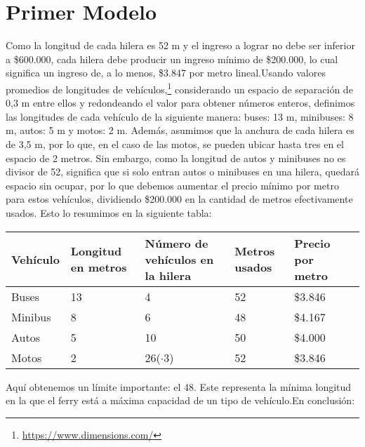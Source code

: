 \documentclass[a4paper]{article}
\begin{document}
\section{Primer Modelo}
Como la longitud de cada hilera es 52 m y el ingreso a lograr no debe ser inferior a \$600.000, cada hilera debe producir un ingreso mínimo de \$200.000, lo cual significa un ingreso de, a lo menos, \$3.847 por metro lineal.\newline\newline Usando valores promedios de longitudes de vehículos,\footnote{\url{https://www.dimensions.com/}} considerando un espacio de separación de 0,3 m entre ellos y redondeando el valor para obtener números enteros, definimos las longitudes de cada vehículo de la siguiente manera: buses: 13 m, minibuses: 8 m, autos: 5 m y motos: 2 m. Además, asumimos que la anchura de cada hilera es de 3,5 m, por lo que, en el caso de las motos, se pueden ubicar hasta tres en el espacio de 2 metros. \newline\newline Sin embargo, como la longitud de autos y minibuses no es divisor de 52, significa que si solo entran autos o minibuses en una hilera, quedará espacio sin ocupar, por lo que debemos aumentar el precio mínimo por metro para estos vehículos, dividiendo \$200.000 en la cantidad de metros efectivamente usados. Esto lo resumimos en la siguiente tabla:
\begin{table}[h]
    \centering
    \begin{adjustbox}{width=1\textwidth}
\small
\begin{tabular}{|M{2cm}|M{2cm}|M{2cm}|M{2cm}|M{2cm}|M{2cm}|}
       \hline
       Vehículo&Longitud en metros & Número de vehículos en la hilera & Metros usados& Precio por metro \\
       \hline
       Buses&13& 4& 52& \$3.846  \\
       \hline
       Minibus&8  & 6 & 48&\$4.167   \\
       \hline
       Autos& 5 & 10 & 50&\$4.000  \\
       \hline
       Motos&2& 26($\cdot 3$) &52& \$3.846  \\
       \hline
    \end{tabular}  
    \end{adjustbox}
    
\end{table}
\newline Aquí obtenemos un límite importante: el 48. Este representa la mínima longitud en la que el ferry está a máxima capacidad de un tipo de vehículo.\newline\newline En conclusión:\newline\newline
\end{document}
